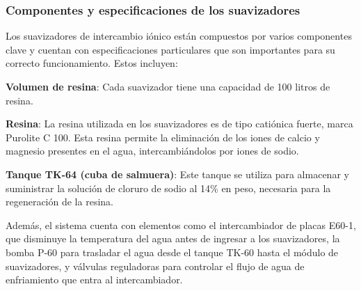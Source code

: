 \subsubsection{Componentes y especificaciones de los suavizadores}

Los suavizadores de intercambio iónico están compuestos por varios componentes clave y cuentan con especificaciones particulares que son importantes para su correcto funcionamiento. Estos incluyen:

\textbf{Volumen de resina}: Cada suavizador tiene una capacidad de 100 litros de resina.

\textbf{Resina}: La resina utilizada en los suavizadores es de tipo catiónica fuerte, marca Purolite C 100. Esta resina permite la eliminación de los iones de calcio y magnesio presentes en el agua, intercambiándolos por iones de sodio.

\textbf{Tanque TK-64 (cuba de salmuera)}: Este tanque se utiliza para almacenar y suministrar la solución de cloruro de sodio al 14\% en peso, necesaria para la regeneración de la resina.

Además, el sistema cuenta con elementos como el intercambiador de placas E60-1, que disminuye la temperatura del agua antes de ingresar a los suavizadores, la bomba P-60 para trasladar el agua desde el tanque TK-60 hasta el módulo de suavizadores, y válvulas reguladoras para controlar el flujo de agua de enfriamiento que entra al intercambiador.
